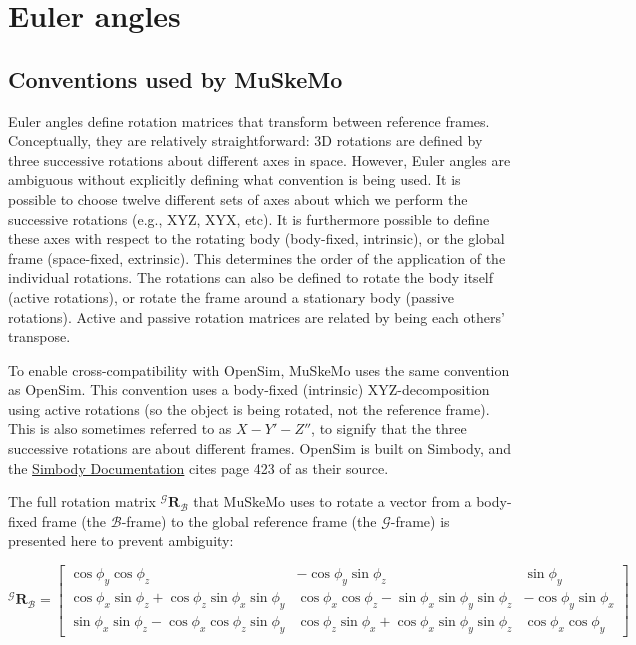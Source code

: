 \documentclass{article}
\begin{document}
\appendix
\section{Euler angles}
\label{sec:eulerangles}

\subsection{Conventions used by MuSkeMo}
Euler angles define rotation matrices that transform between reference frames. Conceptually, they are relatively straightforward: 3D rotations are defined by three successive rotations about different axes in space. However, Euler angles are ambiguous without explicitly defining what convention is being used. It is possible to choose twelve different sets of axes about which we perform the successive rotations (e.g., XYZ, XYX, etc). It is furthermore possible to define these axes with respect to the rotating body (body-fixed, intrinsic), or the global frame (space-fixed, extrinsic). This determines the order of the application of the individual rotations. The rotations can also be defined to rotate the body itself (active rotations), or rotate the frame around a stationary body (passive rotations). Active and passive rotation matrices are related by being each others' transpose.

To enable cross-compatibility with OpenSim, MuSkeMo uses the same convention as OpenSim. This convention uses a body-fixed (intrinsic) XYZ-decomposition using active rotations (so the object is being rotated, not the reference frame). This is also sometimes referred to as \(X-Y'-Z''\), to signify that the three successive rotations are about different frames. OpenSim is built on Simbody, and the \href{https://simtk.org/api_docs/molmodel/api_docs22/Simbody/html/classSimTK_1_1Rotation__.html}{Simbody Documentation} cites page 423 of \cite{kaneSpacecraftDynamics1983} as their source.

The full rotation matrix ${}^{\mathcal{G}} \mathbf{R}_{\mathcal{B}}$ that MuSkeMo uses to rotate a vector from a body-fixed frame (the ${\mathcal{B}}$-frame) to the global reference frame (the ${\mathcal{G}}$-frame) is presented here to prevent ambiguity:


\begin{equation}
    {}^{\mathcal{G}} \mathbf{R}_{\mathcal{B}} =
    \begin{bmatrix}
    \cos \phi_y \cos \phi_z & -\cos \phi_y \sin \phi_z & \sin \phi_y \\
    \cos \phi_x \sin \phi_z + \cos \phi_z \sin \phi_x \sin \phi_y & \cos \phi_x \cos \phi_z - \sin \phi_x \sin \phi_y \sin \phi_z & -\cos \phi_y \sin \phi_x \\
    \sin \phi_x \sin \phi_z - \cos \phi_x \cos \phi_z \sin \phi_y & \cos \phi_z \sin \phi_x + \cos \phi_x \sin \phi_y \sin \phi_z & \cos \phi_x \cos \phi_y
    \end{bmatrix}
    \label{eq:grbmatrix}
\end{equation}
\end{document}
